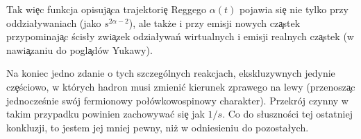 Tak wi\c{e}c funkcja opisuj\c{a}ca trajektori\c{e} Reggego $\alpha(t)$ pojawia si\c{e} nie tylko
przy oddzia\l ywaniach (jako $s^{2\alpha -2}$), ale tak\.{z}e i przy emisji nowych cz\c{a}stek
przypominaj\c{a}c \'{s}cis\l y zwi\c{a}zek odzia\l ywa\'{n} wirtualnych i emisji realnych
cz\c astek (w nawi\c{a}zaniu do pogl\c{a}d\'{o}w Yukawy).

Na koniec jedno zdanie o tych szczeg\'{o}lnych reakcjach, ekskluzywnych jedynie cz\c{e}\'{s}ciowo,
w kt\'{o}rych hadron musi zmieni\'{c} kierunek zprawego na lewy
(przenosz\c{a}c jednocze\'{s}nie sw\'{o}j fermionowy po\l\'{o}wkowospinowy charakter).
Przekr\'{o}j czynny w takim przypadku powinien zachowywa\'{c} si\c{e} jak $1/s$.
Co do s\l uszno\'{s}ci tej ostatniej konkluzji, to jestem jej
mniej pewny, ni\.{z} w odniesieniu do pozosta\l ych.













